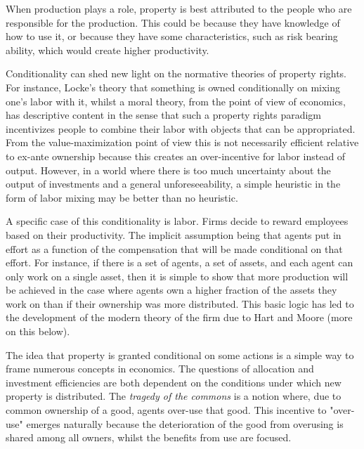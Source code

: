 When production plays a role, property is best attributed to the people who are responsible for the production. This could be because they have knowledge of how to use it, or because they have some characteristics, such as risk bearing ability, which would create higher productivity.

Conditionality can shed new light on the normative theories of property rights. For instance, Locke's theory that something is owned conditionally on mixing one's labor with it, whilst a moral theory, from the point of view of economics, has descriptive content in the sense that such a property rights paradigm incentivizes people to combine their labor with objects that can be appropriated. From the value-maximization point of view this is not necessarily efficient relative to ex-ante ownership because this creates an over-incentive for labor instead of output. However, in a world where there is too much uncertainty about the output of investments and a general unforeseeability, a simple heuristic in the form of labor mixing may be better than no heuristic. 

A specific case of this conditionality is labor. Firms decide to reward employees based on their productivity. The implicit assumption being that agents put in effort as a function of the compensation that will be made conditional on that effort. For instance, if there is a set of agents, a set of assets, and each agent can only work on a single asset, then it is simple to show that more production will be achieved in the case where agents own a higher fraction of the assets they work on than if their ownership was more distributed. This basic logic has led to the development of the modern theory of the firm due to Hart and Moore (more on this below).

The idea that property is granted conditional on some actions is a simple way to frame numerous concepts in economics. The questions of allocation and investment efficiencies are both dependent on the conditions under which new property is distributed. The \textit{tragedy of the commons} is a notion where, due to common ownership of a good, agents over-use that good. This incentive to "over-use" emerges naturally because the deterioration of the good from overusing is shared among all owners, whilst the benefits from use are focused. 

